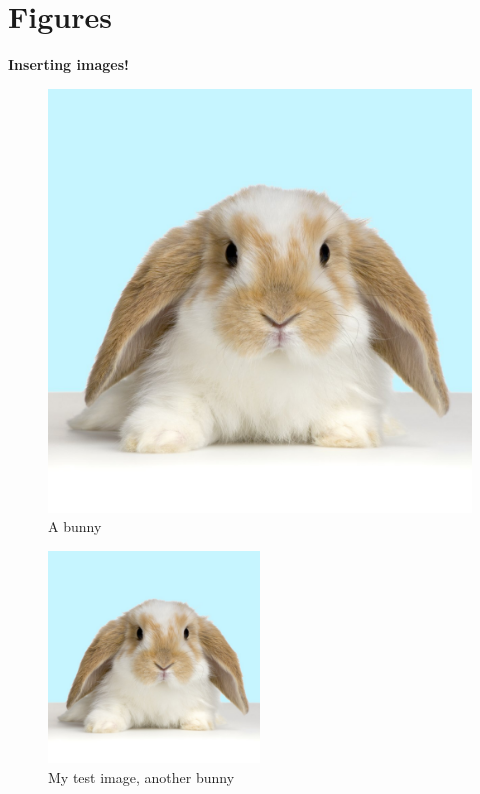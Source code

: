\documentclass[a4paper,12pt]{article}
\begin{document}
\newpage

\section{Figures}
\textbf{Inserting images!}

\begin{figure}[h]
\centering
\includegraphics[scale=0.2]{myimage}
\caption{A bunny}
\label{image-myimage}
\end{figure}

\begin{figure}[h!]
\centering
\includegraphics[width=0.5\textwidth]{"myimage"}
\caption{My test image, another bunny}
\end{figure}
\end{document}

